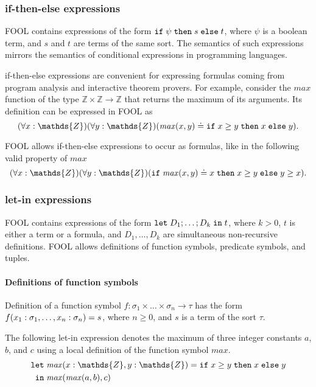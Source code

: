 \documentclass{easychair}
\begin{document}
\subsubsection{if-then-else expressions}
FOOL contains expressions of the form $\mathtt{if}\;{\psi}\;\allowbreak\mathtt{then}\;{s}\;\allowbreak\mathtt{else}\;{t}$, where $\psi$ is a
boolean term, and $s$ and $t$ are terms of the same sort. The semantics of such
expressions mirrors the semantics of conditional expressions in programming
languages.

if-then-else expressions are convenient for expressing formulas coming from
program analysis and interactive theorem provers. For example, consider the
$\mathit{max}$ function of the type $\mathds{Z}\times\mathds{Z}\to\mathds{Z}$
that returns the maximum of its arguments. Its definition can be expressed in
FOOL as
\begin{equation}\label{eq:ite-t-example}
(\forall x:\mathds{Z})(\forall y:\mathds{Z})
(\mathit{max}(x, y) \eql \ite{x \geq y}{x}{y}).
\end{equation}

FOOL allows if-then-else expressions to occur as formulas, like in the
following valid property of $\mathit{max}$
\begin{equation}\label{eq:ite-f-example}
(\forall x:\mathds{Z})(\forall y:\mathds{Z})
(\ite{\mathit{max}(x, y) \eql x}{x \geq y}{y \geq x}).
\end{equation}

\subsubsection{let-in expressions}
FOOL contains expressions of the form $\mathtt{let}\;{D_1;\ldots;D_k}\;\allowbreak\mathtt{in}\;{t}$, where
$k > 0$, $t$ is either a term or a formula, and $D_1,\ldots,D_k$ are
simultaneous non-recursive definitions. FOOL allows definitions of function
symbols, predicate symbols, and tuples.

\paragraph{Definitions of function symbols}
Definition of a function symbol $f:\sigma_1\times\ldots\times\sigma_n\to\tau$
has the form ${f(x_1:\sigma_1,\ldots,x_n:\sigma_n)}={s}$, where
$n \geq 0$, and $s$ is a term of the sort $\tau$.

The following let-in expression denotes the maximum of three integer constants
$a$, $b$, and $c$ using a local definition of the function symbol
$\mathit{max}$.
\begin{equation}\label{eq:fool-let-impl}
\begin{aligned}
\mathtt{let}\;&\binding{\mathit{max}(x:\mathds{Z},y:\mathds{Z})}
                       {\ite{x \geq y}{x}{y}}\\
 \mathtt{in}\;&\mathit{max}(\mathit{max}(a,b),c)
\end{aligned}
\end{equation}
\end{document}

